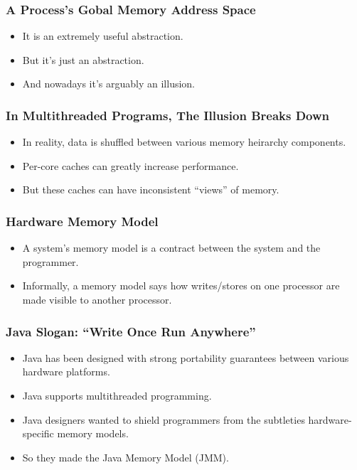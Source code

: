 
\begin{frame}
    \frametitle{A Process's Gobal Memory Address Space}
    \begin{itemize}
        \item It is an extremely useful abstraction.
        \item But it's just an abstraction.
        \item And nowadays it's arguably an illusion.
    \end{itemize}
\end{frame}

\begin{frame}
    \frametitle{In Multithreaded Programs, The Illusion Breaks Down}
    \begin{itemize}
        \item In reality, data is shuffled between various memory heirarchy
              components.
        \item Per-core caches can greatly increase performance.
        \item But these caches can have inconsistent ``views'' of memory.

    \end{itemize}
\end{frame}

\begin{frame}
    \frametitle{Hardware Memory Model}
    \begin{itemize}
        \item A system's memory model is a contract between the system and the
              programmer.
        \item Informally, a memory model says how writes/stores on one processor
              are made visible to another processor.
    \end{itemize}
\end{frame}

\begin{frame}
    \frametitle{Java Slogan: ``Write Once Run Anywhere''}
    \begin{itemize}
        \item Java has been designed with strong portability guarantees between
              various hardware platforms.
        \item Java supports multithreaded programming.
        \item Java designers wanted to shield programmers from the subtleties
              hardware-specific memory models.
        \item So they made the Java Memory Model (JMM).
              \cite{manson2005java}\cite{pugh2004jsr133}\cite{manson2004jsr133}\cite{gosling2018jls11}
    \end{itemize}
\end{frame}

